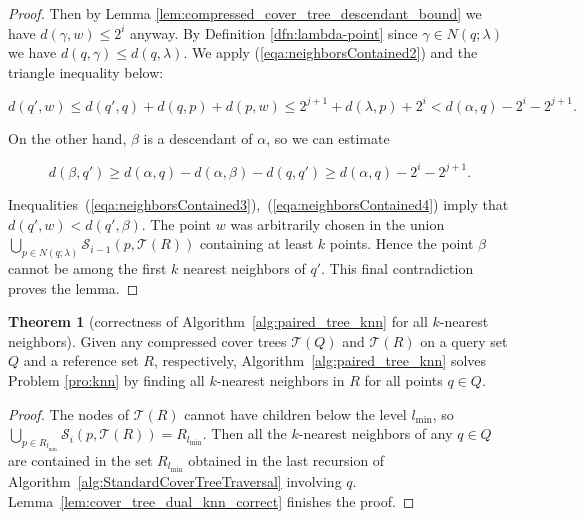 \documentclass[a4paper,UKenglish,cleveref, autoref]{lipics-v2019}
\numberwithin{algocf}{section}
\theoremstyle{definition}
\newtheorem{thmm}[algocf]{Theorem}
\theoremstyle{definition}
\theoremstyle{definition}
\theoremstyle{plain}
\newcommand{\T}{\mathcal{T}}
\newcommand{\Sd}{\mathcal{S}}
\newcommand{\la}{\lambda}
\begin{document}
\begin{proof}
Then by Lemma \ref{lem:compressed_cover_tree_descendant_bound} we have  $d(\gamma, w) \leq 2^{i}$ anyway. 
By Definition \ref{dfn:lambda-point}  since $\gamma \in  N(q;\la)$ we have $d(q,\gamma) \leq d(q,\lambda)$. 
We apply (\ref{eqa:neighborsContained2}) and the triangle inequality below:
\begin{ceqn}
\begin{equation}
\label{eqa:neighborsContained3}
d(q',w) \leq d(q', q) + d(q, p) + d(p,w) \leq 2^{j+1} + d(\lambda, p) + 2^{i}  < d(\alpha,q) - 2^{i} - 2^{j+1}.
\end{equation}
\end{ceqn}
On the other hand, $\beta$ is a descendant of $\alpha$, so we can estimate
\begin{ceqn}
\begin{equation}
\label{eqa:neighborsContained4}
d(\beta,q') \geq d(\alpha,q)  - d(\alpha,\beta) - d(q,q')  \geq d(\alpha,q) - 2^{i} - 2^{j+1}. 
\end{equation}
\end{ceqn}
Inequalities~(\ref{eqa:neighborsContained3}),~(\ref{eqa:neighborsContained4}) imply that $d(q',w) < d(q',\beta)$. 
The point $w$ was arbitrarily chosen in the union $\bigcup_{p \in N(q;\la)}\Sd_{i-1}(p, \T(R))$ containing at least $k$ points.
Hence the point $\beta$ cannot be among the first $k$ nearest neighbors of $q'$.
This final contradiction proves the lemma. 
\end{proof}

\begin{thmm}[correctness of Algorithm~\ref{alg:paired_tree_knn} for all $k$-nearest neighbors]
\label{thm:paired_tree_knn_correctness}
Given any compressed cover trees $\T(Q)$ and $\T(R)$ on a query set $Q$ and a reference set $R$, respectively, Algorithm~\ref{alg:paired_tree_knn} solves Problem \ref{pro:knn} by finding all $k$-nearest neighbors in $R$ for all points $q\in Q$.
\end{thmm}
\begin{proof}
The nodes of $\T(R)$ cannot have children below the level
 $l_{\min}$, so $\bigcup_{p \in R_{l_{\min}}}\Sd_i(p, \T(R)) = R_{l_{\min}}$. Then all the $k$-nearest neighbors of any $q\in Q$ are contained in the set $R_{l_{\min}}$ obtained in the last recursion of Algorithm~\ref{alg:StandardCoverTreeTraversal} involving $q$.
Lemma~\ref{lem:cover_tree_dual_knn_correct} finishes the proof. 
\end{proof}
\end{document}
